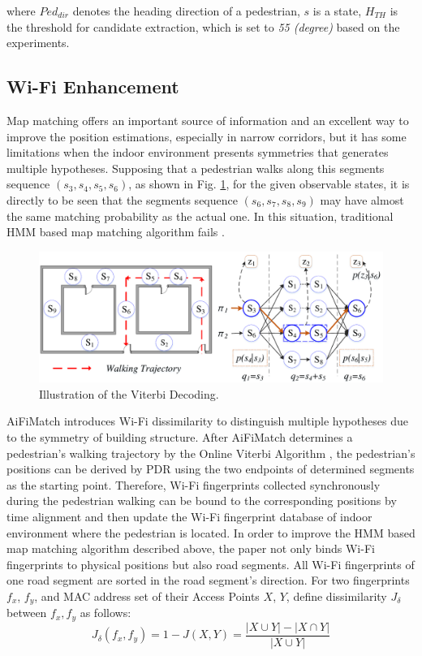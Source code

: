 \documentclass{llncs}
\begin{document}
where $Ped_{dir}$ denotes the heading direction of a pedestrian, $s$ is a state, $H_{TH}$ is the threshold for candidate extraction, which is set to \emph{55 (degree)} based on the experiments.

\subsection{Wi-Fi Enhancement}
Map matching offers an important source of information and an excellent way to improve the position estimations, especially in narrow corridors, but it has some limitations when the indoor environment presents symmetries that generates multiple hypotheses. Supposing that a pedestrian walks along this segments sequence $(s_3, s_4, s_5, s_6)$, as shown in Fig. \ref{fig-viterbi}, for the given observable states, it is directly to be seen that the segments sequence $(s_6, s_7, s_8, s_9)$ may have almost the same matching probability as the actual one. In this situation, traditional HMM based map matching algorithm fails \cite{zhou2015activity}.

\vspace{-10pt}
\begin{figure}[!htbp]
	\centering
	\includegraphics[width=4.6in]{AiFiMatch-Viterbi}
	\caption{Illustration of the Viterbi Decoding.}
	\label{fig-viterbi}
\end{figure}
\vspace{-10pt}

AiFiMatch introduces Wi-Fi dissimilarity to distinguish multiple hypotheses due to the symmetry of building structure. After AiFiMatch determines a pedestrian's walking trajectory by the Online Viterbi Algorithm \cite{aly2015semmatch}, the pedestrian's positions can be derived by PDR using the two endpoints of determined segments as the starting point. Therefore, Wi-Fi fingerprints collected synchronously during the pedestrian walking can be bound to the corresponding positions by time alignment and then update the Wi-Fi fingerprint database of indoor environment where the pedestrian is located. In order to improve the HMM based map matching algorithm described above, the paper not only binds Wi-Fi fingerprints to physical positions but also road segments. All Wi-Fi fingerprints of one road segment are sorted in the road segment's direction. For two fingerprints $f_x$, $f_y$, and MAC address set of their Access Points $X$, $Y$, define dissimilarity $J_{\delta}$ between $f_x,f_y$ as follows:
\begin{equation}
{J_\delta }(f_x,f_y) = 1 - J(X,Y) = \frac{{|X \cup Y| - |X \cap Y|}}{{|X \cup Y|}}
\label{equ-jad}
\end{equation}
\end{document}
